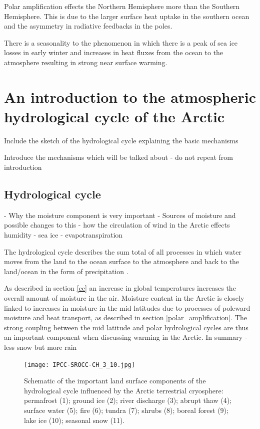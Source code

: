 \documentclass[11pt, oneside]{article}
\begin{document}
Polar amplification effects the Northern Hemisphere more than the Southern Hemisphere. This is due to the larger surface heat uptake in the southern ocean and the asymmetry in radiative feedbacks in the poles. 

There is a seasonality to the phenomenon in which there is a peak of sea ice losses in early winter and increases in heat fluxes from the ocean to the atmosphere resulting in strong near surface warming. 


\section{An introduction to the atmospheric hydrological cycle of the Arctic}
Include the sketch of the hydrological cycle explaining the basic mechanisms

Introduce the mechanisms which will be talked about - do not repeat from introduction

\subsection{Hydrological cycle}
{\color{blue}- Why the moisture component is very important 
- Sources of moisture and possible changes to this }
{\color{blue}-  how the circulation of wind in the Arctic effects humidity 
- sea ice 
- evapotranspiration }

The hydrological cycle describes the sum total of all processes in which water moves from the land to the ocean surface to the atmosphere and back to the land/ocean in the form of precipitation \cite{CHAKRAVARTY2019203}. 

As described in section \ref{cc} an increase in global temperatures increases the overall amount of moisture in the air. Moisture content in the Arctic is closely linked to increases in moisture in the mid latitudes due to processes of poleward moisture and heat transport, as described in section \ref{polar_amplification}. The strong coupling between the mid latitude and polar hydrological cycles are thus an important component when discussing warming in the Arctic.   
{\color{blue} In summary - less snow but more rain }

\begin{figure}[h!]
\centering
\texttt{[image: IPCC-SROCC-CH\_3\_10.jpg]}
\caption{Schematic of the important land surface components of the hydrological cycle influenced by the Arctic terrestrial cryosphere: permafrost (1); ground ice (2); river discharge (3); abrupt thaw (4); surface water (5); fire (6); tundra (7); shrubs (8); boreal forest (9); lake ice (10); seasonal snow (11). \cite{ipcc}}\label{fig:hydro}
\end{figure}
\end{document}

